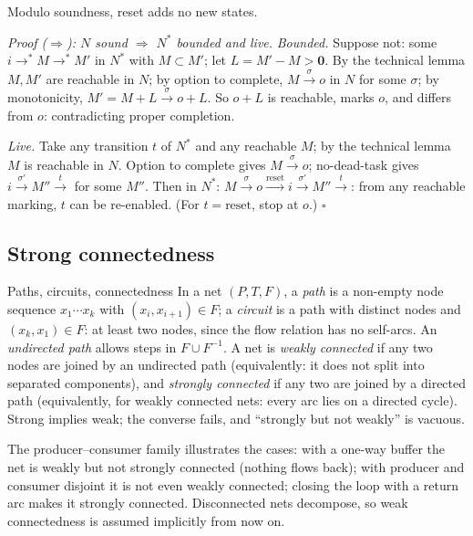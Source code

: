 Modulo soundness, reset adds no new states.

\textit{Proof ($\Rightarrow$): $N$ sound $\Rightarrow$ $N^*$ bounded and live.} \emph{Bounded.} Suppose not: some $i \to^\ast M \to^\ast M'$ in $N^*$ with $M \subset M'$; let $L = M' - M > \mathbf{0}$. By the technical lemma $M, M'$ are reachable in $N$; by option to complete, $M \xrightarrow{\sigma} o$ in $N$ for some $\sigma$; by monotonicity, $M' = M + L \xrightarrow{\sigma} o + L$. So $o + L$ is reachable, marks $o$, and differs from $o$: contradicting proper completion.
\par\smallskip
\emph{Live.} Take any transition $t$ of $N^*$ and any reachable $M$; by the technical lemma $M$ is reachable in $N$. Option to complete gives $M \xrightarrow{\sigma} o$; no-dead-task gives $i \xrightarrow{\sigma'} M'' \xrightarrow{t}$ for some $M''$. Then in $N^*$: $M \xrightarrow{\sigma} o \xrightarrow{\text{reset}} i \xrightarrow{\sigma'} M'' \xrightarrow{t}$: from any reachable marking, $t$ can be re-enabled. (For $t = \text{reset}$, stop at $o$.) \hfill$\square$

\subsection{Strong connectedness}

\begin{definitionbox}{Paths, circuits, connectedness}
In a net $(P, T, F)$, a \emph{path} is a non-empty node sequence $x_1 \cdots x_k$ with $(x_i, x_{i+1}) \in F$; a \emph{circuit} is a path with distinct nodes and $(x_k, x_1) \in F$: at least two nodes, since the flow relation has no self-arcs. An \emph{undirected path} allows steps in $F \cup F^{-1}$. A net is \emph{weakly connected} if any two nodes are joined by an undirected path (equivalently: it does not split into separated components), and \emph{strongly connected} if any two are joined by a directed path (equivalently, for weakly connected nets: every arc lies on a directed cycle). Strong implies weak; the converse fails, and ``strongly but not weakly'' is vacuous.
\end{definitionbox}

The producer--consumer family illustrates the cases: with a one-way buffer the net is weakly but not strongly connected (nothing flows back); with producer and consumer disjoint it is not even weakly connected; closing the loop with a return arc makes it strongly connected. Disconnected nets decompose, so weak connectedness is assumed implicitly from now on.

